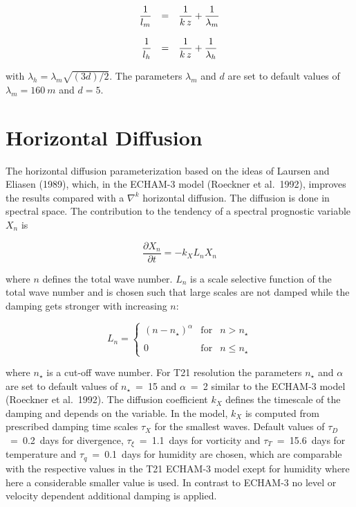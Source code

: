 \begin{equation}
\begin{array}{rcl}
\displaystyle \frac{1}{l_m} & = & \displaystyle \frac{1}{k\, z}
+\frac{1}{\lambda_m} \\
&&\\
\displaystyle \frac{1}{l_h} & = & \displaystyle \frac{1}{k\, z}
+\frac{1}{\lambda_h}
\end{array}
\end{equation}

with $\lambda_h = \lambda_m\sqrt{(3 d)/2}$. The
parameters $\lambda_m$ and $d$ are set to default
values
of  $\lambda_m = 160~m$  and $d= 5$.

\newpage

\section{Horizontal Diffusion}

The horizontal diffusion parameterization based on the
ideas of Laursen and Eliasen (1989),
which, in the ECHAM-3 model (Roeckner et al.~1992),
improves the results compared with a
${\nabla}^k$ horizontal diffusion. The  diffusion is
done in spectral space. The contribution to
the tendency of a spectral prognostic variable $X_n$ is 

\begin{equation}
\frac{\partial X_n}{\partial t} = -k_X L_n X_n
\end{equation}

where $n$ defines the total wave number. $L_n$ is a
scale selective function of the total wave
number and is chosen such that large scales are not
damped while the damping gets stronger
with increasing $n$:
  
\begin{equation}
L_n = \left\{ \begin{array}{lcl} (n-n_{\star})^{\alpha}
& \mbox{for} & n > n_{\star} \\
                                                  &&\\
                                                     0 & \mbox{for} & n
\le n_{\star} \end{array}
\right.
\end{equation}

where $n_{\star}$ is a cut-off wave number. For T21 resolution the
parameters $n_{\star}$ and $\alpha$ are set
to default values of $n_{\star}$~=~15 and
$\alpha$~=~2 similar to the ECHAM-3 model (Roeckner et al.~1992). The diffusion
coefficient $k_X$ defines the timescale of the
damping and depends on the variable. In the model,
$k_X$ is computed from prescribed
damping time scales  $\tau_X$ for the smallest waves.
Default values of 
$\tau_D$~=~0.2~days for divergence,
$\tau_{\xi}$~=~1.1~days for vorticity and
$\tau_T$~=~15.6~days for temperature and $\tau_q$~=~0.1~days for humidity
are chosen, which are comparable with
the respective values in the T21 ECHAM-3 model exept for humidity where here a considerable smaller value is used. In
contrast to ECHAM-3 no level or
velocity dependent additional damping is applied.
 

